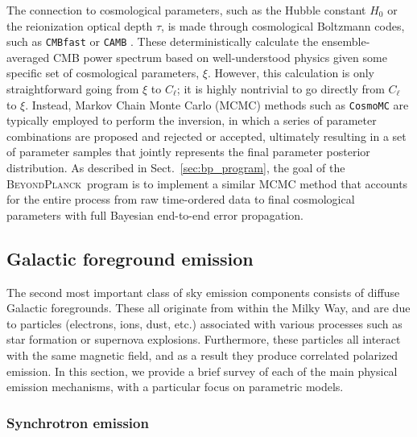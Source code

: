 \documentclass[twocolumn]{aa}
\newcommand{\BP}{\textsc{BeyondPlanck}}
\begin{document}
The connection to cosmological parameters, such as the Hubble constant
$H_0$ or the reionization optical depth $\tau$, is made through
cosmological Boltzmann codes, such as \texttt{CMBfast}
\citep{seljak:1996} or \texttt{CAMB} \citep{Lewis:1999bs}. These
deterministically calculate the ensemble-averaged CMB power spectrum
based on well-understood physics given some specific set of
cosmological parameters, $\xi$. However, this calculation is only
straightforward going from $\xi$ to $C_{\ell}$; it is highly
nontrivial to go directly from $C_{\ell}$ to $\xi$. Instead, Markov
Chain Monte Carlo (MCMC) methods such as \texttt{CosmoMC}
\citep{cosmomc} are typically employed to perform the inversion, in
which a series of parameter combinations are proposed and rejected or
accepted, ultimately resulting in a set of parameter samples that
jointly represents the final parameter posterior distribution. As
described in Sect.~\ref{sec:bp_program}, the goal of the \BP\ program
is to implement a similar MCMC method that accounts for the entire
process from raw time-ordered data to final cosmological parameters
with full Bayesian end-to-end error propagation.

\subsection{Galactic foreground emission}
\label{sec:gal_fg}

The second most important class of sky emission components consists of diffuse
Galactic foregrounds. These all originate from within the Milky Way,
and are due to particles (electrons, ions, dust, etc.) associated with
various processes such as star formation or supernova
explosions. Furthermore, these particles all interact with the same
magnetic field, and as a result they produce correlated polarized
emission. In this section, we provide a brief survey of each of the
main physical emission mechanisms, with a particular focus on
parametric models.

\subsubsection{Synchrotron emission}
\label{sec:synchrotron}
\end{document}
